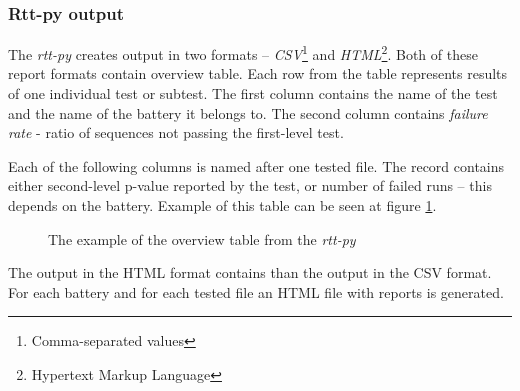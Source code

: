 \documentclass[
  digital,     %
  oneside,     %
  nosansbold,  %
  nocolorbold, %
  nolof,         %
  nolot,         %
]{fithesis4}
\begin{document}
\subsubsection{Rtt-py output}
The \emph{rtt-py} creates output in two formats -- \emph{CSV}\footnote{Comma-separated values} and \emph{HTML}\footnote{Hypertext Markup Language}. \cite[p. 36]{vavercak} Both of these report formats contain overview table. Each row from the table represents results of one individual test or subtest. The first column contains the name of the test and the name of the battery it belongs to. The second column contains \emph{failure rate} - ratio of sequences not passing the first-level test.

Each of the following columns is named after one tested file. The record contains either second-level p-value reported by the test, or number of failed runs -- this depends on the battery. Example of this table can be seen at figure \ref{fig:rtt_py_table}.
\begin{figure}
  \begin{center}
  \end{center}
  \caption{The example of the overview table from the \emph{rtt-py}}
  \label{fig:rtt_py_table}
\end{figure}


The output in the HTML format contains than the output in the CSV format. For each battery and for each tested file an HTML file with reports is generated.
\end{document}
